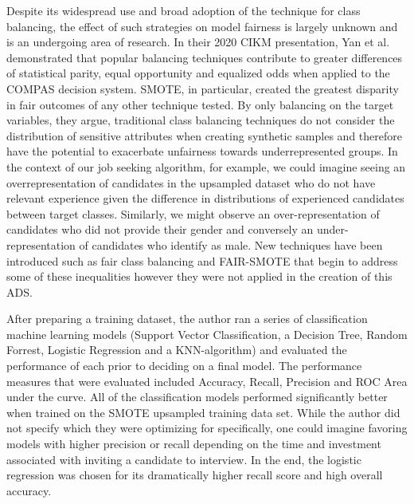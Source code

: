 Despite its widespread use and broad adoption of the technique for class balancing, the effect of such strategies on model fairness is largely unknown and is an undergoing area of research. In their 2020 CIKM presentation, Yan et al. demonstrated that popular balancing techniques contribute to greater differences of statistical parity, equal opportunity and equalized odds when applied to the COMPAS decision system. SMOTE, in particular, created the greatest disparity in fair outcomes of any other technique tested. By only balancing on the target variables, they argue, traditional class balancing techniques do not consider the distribution of sensitive attributes when creating synthetic samples and therefore have the potential to exacerbate unfairness towards underrepresented groups. In the context of our job seeking algorithm, for example, we could imagine seeing an over\-representation of candidates in the upsampled dataset who do not have relevant experience given the difference in distributions of experienced candidates between target classes. Similarly, we might observe an over-representation of candidates who did not provide their gender and conversely an under-representation of candidates who identify as male.  New techniques have been introduced such as 
fair class balancing and FAIR-SMOTE that begin to address some of these inequalities however they were not applied in the creation of this ADS.

After preparing a training dataset, the author ran a series of classification machine learning models (Support Vector Classification, a Decision Tree, Random Forrest, Logistic Regression and a KNN-algorithm) and evaluated the performance of each prior to deciding on a final model.  The 
performance measures that were evaluated included Accuracy, Recall, Precision and ROC Area under the curve. All of the classification models performed significantly better when trained on the SMOTE upsampled training data set.  While the author did not specify which they were optimizing for specifically, one could imagine favoring models with higher precision or recall depending on the time and investment associated with inviting a candidate to interview.  In the end, the logistic regression was chosen for its dramatically higher recall score and high overall accuracy.


